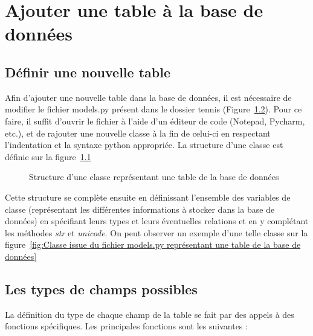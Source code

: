 \chapter{Ajouter une table à la base de données}

\section{Définir une nouvelle table}

Afin d'ajouter une nouvelle table dans la base de données, il est nécessaire de modifier le fichier models.py présent dans le dossier tennis (Figure~\ref{}). Pour ce faire, il suffit d'ouvrir le fichier à l'aide d'un éditeur de code (Notepad, Pycharm, etc.), et de rajouter une nouvelle classe à la fin de celui-ci en respectant l'indentation et la syntaxe python appropriée. La structure d'une classe est définie sur la figure~\ref{fig:Structure d'une classe représentant une table de la base de données}

\begin{figure}[!ht]
\centering
\begin{framed}

\end{framed}
\caption{Structure d'une classe représentant une table de la base de données}
\label{fig:Structure d'une classe représentant une table de la base de données}
\end{figure}
\FloatBarrier

Cette structure se complète ensuite en définissant l'ensemble des variables de classe (représentant les différentes informations à stocker dans la base de données) en spécifiant leurs types et leurs éventuelles relations et en y complétant les méthodes \textit{str} et \textit{unicode}. On peut observer un exemple d'une telle classe sur la figure~\ref{fig:Classe issue du fichier models.py représentant une table de la base de données}

\section{Les types de champs possibles}

La définition du type de chaque champ de la table se fait par des appels à des fonctions spécifiques. Les principales fonctions sont les suivantes :\\

